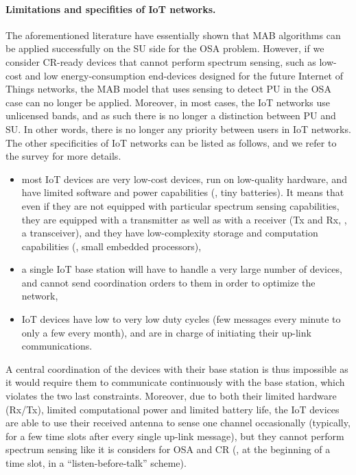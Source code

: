 \paragraph{Limitations and specifities of IoT networks.}
%
The aforementioned literature have essentially shown that MAB algorithms can be applied successfully on the SU side for the OSA problem.
However, if we consider CR-ready devices that cannot perform spectrum sensing, such as low-cost and low energy-consumption end-devices designed for the future Internet of Things networks, the MAB model that uses sensing to detect PU in the OSA case can no longer be applied.
Moreover, in most cases, the IoT networks use unlicensed bands, and as such there is no longer a distinction between PU and SU.
In other words, there is no longer any priority between users in IoT networks.
%
The other specificities of IoT networks can be listed as follows,
and we refer to the survey \cite{Centenaro16} for more details.
\begin{itemize}\tightlist
    \item
    most IoT devices are very low-cost devices, run on low-quality hardware, and have limited software and power capabilities (\ie, tiny batteries).
    It means that even if they are not equipped with particular spectrum sensing capabilities,
    they are equipped with a transmitter as well as with a receiver (Tx and Rx, \ie, a transceiver),
    and they have low-complexity storage and computation capabilities (\ie, small embedded processors),
    \item
    a single IoT base station will have to handle a very large number of devices,
    and cannot send coordination orders to them in order to optimize the network,
    \item
    IoT devices have low to very low duty cycles (few messages every minute to only a few every month), and are in charge of initiating their up-link communications.
\end{itemize}

A central coordination of the devices with their base station is thus impossible as it would require them to communicate continuously with the base station, which violates the two last constraints.
%
Moreover, due to both their limited hardware (Rx/Tx), limited computational power and limited battery life, the IoT devices are able to use their received antenna to sense one channel occasionally (typically, for a few time slots after every single up-link message), but they cannot perform spectrum sensing like it is considers for OSA and CR (\ie, at the beginning of a time slot, in a ``listen-before-talk'' scheme).

